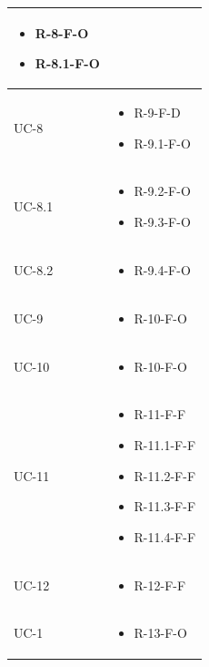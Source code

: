 \begin{center}
\begin{longtable}{| C{6cm} |C{6cm}|}
\begin{itemize}
            \item R-8-F-O
            \item R-8.1-F-O
        \end{itemize}  \\\hline
        UC-8 &
        \begin{itemize}
            \item R-9-F-D
            \item R-9.1-F-O
        \end{itemize}\\\hline
        UC-8.1 &
        \begin{itemize}
            \item R-9.2-F-O
            \item R-9.3-F-O
        \end{itemize} \\\hline
        UC-8.2 &
        \begin{itemize}
            \item R-9.4-F-O
        \end{itemize}\\\hline
        UC-9 & \begin{itemize}
                   \item R-10-F-O
        \end{itemize}\\\hline
        UC-10 &
        \begin{itemize}
            \item R-10-F-O
        \end{itemize}
        \\\hline
        UC-11 &
        \begin{itemize}
            \item R-11-F-F
            \item R-11.1-F-F
            \item R-11.2-F-F
            \item R-11.3-F-F
            \item R-11.4-F-F
        \end{itemize}
        \\\hline


        UC-12 &
        \begin{itemize}
            \item R-12-F-F
        \end{itemize}
        \\\hline

        UC-1 &
        \begin{itemize}
            \item R-13-F-O
        \end{itemize}
        \\\hline


\end{longtable}
\end{center}
